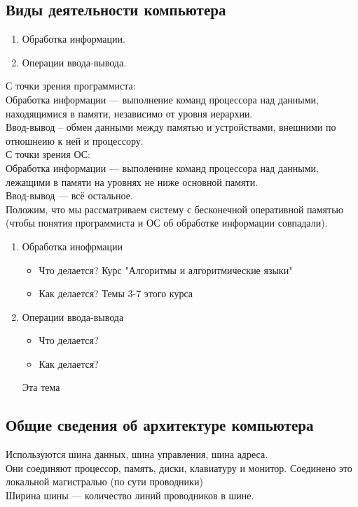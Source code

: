 \documentclass[12pt, a4paper]{article}
\begin{document}
    \subsection{Виды деятельности компьютера}
    \begin{enumerate}
        \item Обработка информации.
        \item Операции ввода-вывода.
    \end{enumerate}
    С точки зрения программиста:\\
    {\color{blue} Обработка информации} --- выполнение команд процессора над данными, находящимися в памяти, независимо от уровня иерархии.\\
    {\color{blue} Ввод-вывод} -- обмен данными между памятью и устройствами, внешними по отношнеию к ней и процессору.\\
    С точки зрения ОС:\\
    {\color{blue} Обработка информации} --- выполенине команд процессора над данными, лежащими в памяти на уровнях не ниже основной памяти.\\
    {\color{blue} Ввод-вывод} --- всё остальное.\\
    Положим, что мы рассматриваем систему с бесконечной оперативной памятью (чтобы понятия программиста и ОС об обработке информации совпадали).\\
    \begin{enumerate}
        \item Обработка инофрмации
        \begin{itemize}
            \item Что делается? Курс "Алгоритмы и алгоритмические языки"
            \item Как делается? Темы 3-7 этого курса
        \end{itemize}
        \item Операции ввода-вывода
        
        \begin{itemize}
            \item Что делается?
            \item Как делается?
        \end{itemize} Эта тема
    \end{enumerate}
    \subsection{Общие сведения об архитектуре компьютера}
    Используются шина данных, шина управления, шина адреса.\\
    Они соединяют процессор, память, диски, клавиатуру и монитор. Соединено это локальной магистралью (по сути проводники)\\
    Ширина шины --- количество линий проводников в шине.
\end{document}
